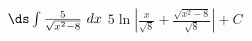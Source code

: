 {$\ds \int \frac5{\sqrt{x^2-8}}\ dx$\label{06_08_ex_16}
}
{$5\ln\left|\frac{x}{\sqrt{8}}+\frac{\sqrt{x^2-8}}{\sqrt{8}}\right|+C$
}